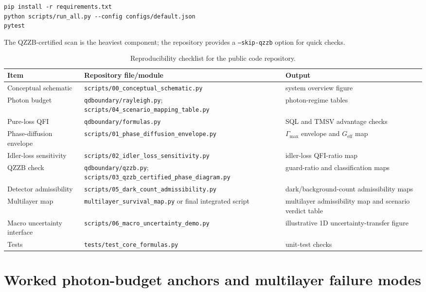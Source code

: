 \documentclass[a4paper,11pt]{article}
\numberwithin{equation}{section}
\newcommand{\Geff}{G_{\mathrm{eff}}}
\begin{document}
\begin{verbatim}
pip install -r requirements.txt
python scripts/run_all.py --config configs/default.json
pytest
\end{verbatim}
The QZZB-certified scan is the heaviest component; the repository provides a \texttt{--skip-qzzb} option for quick checks.


\begin{table}[htbp]
\centering
\caption{Reproducibility checklist for the public code repository.}
\label{tab:repro}
\scriptsize
\renewcommand{\arraystretch}{1.15}
\begin{tabularx}{\textwidth}{p{}p{}X}
\toprule
Item & Repository file/module & Output \\
\midrule
Conceptual schematic & \texttt{scripts/00\_conceptual\_schematic.py} & system overview figure \\
Photon budget & \texttt{qdboundary/rayleigh.py}; \texttt{scripts/04\_scenario\_mapping\_table.py} & photon-regime tables \\
Pure-loss QFI & \texttt{qdboundary/formulas.py} & SQL and TMSV advantage checks \\
Phase-diffusion envelope & \texttt{scripts/01\_phase\_diffusion\_envelope.py} & $\Gamma_{\max}$ envelope and $\Geff$ map \\
Idler-loss sensitivity & \texttt{scripts/02\_idler\_loss\_sensitivity.py} & idler-loss QFI-ratio map \\
QZZB check & \texttt{qdboundary/qzzb.py}; \texttt{scripts/03\_qzzb\_certified\_phase\_diagram.py} & guard-ratio and classification maps \\
Detector admissibility & \texttt{scripts/05\_dark\_count\_admissibility.py} & dark/background-count admissibility maps \\
Multilayer map & \texttt{multilayer\_survival\_map.py} or final integrated script & multilayer admissibility map and scenario verdict table \\
Macro uncertainty interface & \texttt{scripts/06\_macro\_uncertainty\_demo.py} & illustrative 1D uncertainty-transfer figure \\
Tests & \texttt{tests/test\_core\_formulas.py} & unit-test checks \\
\bottomrule
\end{tabularx}
\end{table}



\section{Worked photon-budget anchors and multilayer failure modes}
\label{app:worked_examples}
\end{document}
